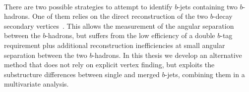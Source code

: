 






\\[5mm]
There are two possible strategies to attempt to identify $b$-jets containing two $b$-hadrons. One of them relies on the direct reconstruction of the two $b$-decay secondary vertices~\cite{CDFAzimutalCorrelation}. This %
allows the measurement of the angular separation between the $b$-hadrons, but suffers from the low efficiency of a double $b$-tag requirement plus additional reconstruction inefficiencies at small angular separation between the two $b$-hadrons. In this thesis we develop an alternative method that does not rely on explicit vertex finding, but exploits the substructure differences between single and merged $b$-jets, combining them in a multivariate analysis. 

